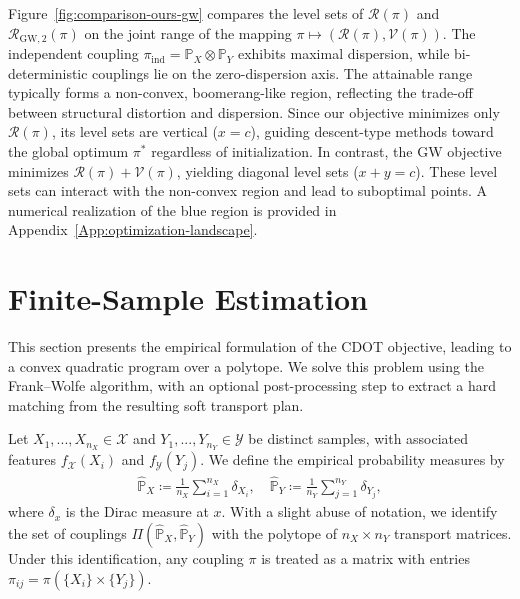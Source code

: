 \documentclass{article}
\theoremstyle{plain}
\theoremstyle{definition}
\theoremstyle{remark}
\begin{document}
Figure~\ref{fig:comparison-ours-gw} compares the level sets of $\mathcal{R}(\pi)$ and $\mathcal{R}_{\mathrm{GW},2}(\pi)$ on the joint range of the mapping $\pi \mapsto (\mathcal{R}(\pi), \mathcal{V}(\pi))$. The independent coupling $\pi_{\mathrm{ind}} = \mathbb{P}_X \otimes \mathbb{P}_Y$ exhibits maximal dispersion, while bi-deterministic couplings lie on the zero-dispersion axis. The attainable range typically forms a non-convex, boomerang-like region, reflecting the trade-off between structural distortion and dispersion. Since our objective minimizes only $\mathcal{R}(\pi)$, its level sets are vertical ($x=c$), guiding descent-type methods toward the global optimum $\pi^*$ regardless of initialization. In contrast, the GW objective minimizes $\mathcal{R}(\pi)+\mathcal{V}(\pi)$, yielding diagonal level sets ($x+y=c$). These level sets can interact with the non-convex region and lead to suboptimal points. A numerical realization of the blue region is provided in Appendix~\ref{App:optimization-landscape}.

\section{Finite-Sample Estimation}\label{sec:Estimation}

This section presents the empirical formulation of the CDOT objective, leading to a convex quadratic program over a polytope. We solve this problem using the Frank--Wolfe algorithm, with an optional post-processing step to extract a hard matching from the resulting soft transport plan.

Let $X_1,...,X_{n_X}\in\mathcal{X}$ and $Y_1,...,Y_{n_Y}\in\mathcal{Y}$ be distinct samples, with associated features $f_{\mathcal{X}}(X_i)$ and $f_{\mathcal{Y}}(Y_j)$. We define the empirical probability measures by \vspace{-2mm}
\begin{align*}
	\hat{\mathbb{P}}_X \coloneqq \frac{1}{n_X} \sum_{i=1}^{n_X} \delta_{X_i}, \quad \hat{\mathbb{P}}_Y \coloneqq \frac{1}{n_Y}\sum_{j=1}^{n_Y} \delta_{Y_j}, 
\end{align*} 
where $\delta_x$ is the Dirac measure at $x$. With a slight abuse of notation, we identify the set of couplings $\Pi(\hat{\mathbb{P}}_X, \hat{\mathbb{P}}_Y)$ with the polytope of $n_X \times n_Y$ transport matrices. Under this identification, any coupling $\pi$ is treated as a matrix with entries $\pi_{ij} = \pi(\{X_i\} \times \{Y_j\})$.
\end{document}
